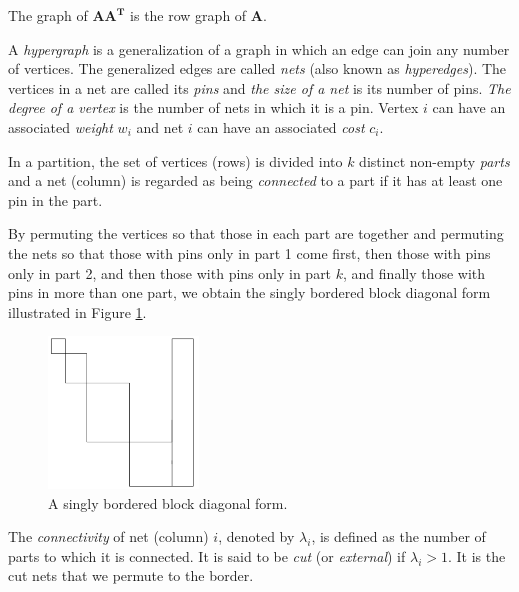 \begin{prop}
  The graph of $\mathbf{AA^T}$ is the row graph of $\mathbf{A}$.
\end{prop}

\begin{defn}
  A \emph{hypergraph} is a generalization of a graph in which an edge can
  join any number of vertices. The generalized edges are called
  \emph{nets} (also known as \emph{hyperedges}). The vertices in a net
  are called its \emph{pins} and \emph{the size of a net} is its
  number of pins. \emph{The degree of a vertex} is the number of nets in
  which it is a pin. Vertex $i$ can have an associated \emph{weight} $w_i$
  and net $i$ can have an associated \emph{cost} $c_i$.
\end{defn}

\begin{defn}
  In a partition, the set of vertices (rows) is divided into $k$
  distinct non-empty \emph{parts} and a net (column) is regarded as being
  \emph{connected} to a part if it has at least one pin in the part.
\end{defn}

\begin{thm}
  By permuting the vertices so that those in each part are together
  and permuting the nets so that those with pins only in part 1 come
  first, then those with pins only in part 2, and then those with pins
  only in part $k$, and finally those with pins in more than one part,
  we obtain the singly bordered block diagonal form illustrated in
  Figure \ref{fig:SinglyBBDF}. 
  \begin{figure}[H]
    \centering
    \includegraphics[width=4cm]{png/SinglyBBDF.png}
    \caption{A singly bordered block diagonal form.}
    \label{fig:SinglyBBDF}
  \end{figure}
\end{thm}

\begin{defn}
  The \emph{connectivity} of net (column) $i$, denoted by $\lambda_i$,
  is defined as the number of parts to which it is connected. It is
  said to be \emph{cut} (or \emph{external}) if $\lambda_i>1$. It is the cut nets
  that we permute to the border.
\end{defn}

